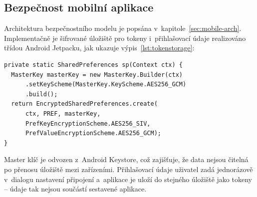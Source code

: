 \subsection{Bezpečnost mobilní aplikace}

Architektura bezpečnostního modelu je popsána v~kapitole~\ref{sec:mobile-arch}. Implementačně je šifrované úložiště pro tokeny i~přihlašovací údaje realizováno třídou Android Jetpacku, jak ukazuje výpis~\ref{lst:tokenstorage}:

\begin{listing}[H]
\caption{Inicializace šifrovaného úložiště}\label{lst:tokenstorage}
\begin{verbatim}
private static SharedPreferences sp(Context ctx) {
  MasterKey masterKey = new MasterKey.Builder(ctx)
      .setKeyScheme(MasterKey.KeyScheme.AES256_GCM)
      .build();
  return EncryptedSharedPreferences.create(
      ctx, PREF, masterKey,
      PrefKeyEncryptionScheme.AES256_SIV,
      PrefValueEncryptionScheme.AES256_GCM);
}
\end{verbatim}
\end{listing}

Master klíč je odvozen z~Android Keystore, což zajišťuje, že data nejsou čitelná po přenosu úložiště mezi zařízeními. Přihlašovací údaje uživatel zadá jednorázově v~dialogu nastavení připojení a~aplikace je uloží do stejného úložiště jako tokeny -- údaje tak nejsou součástí sestavené aplikace.


